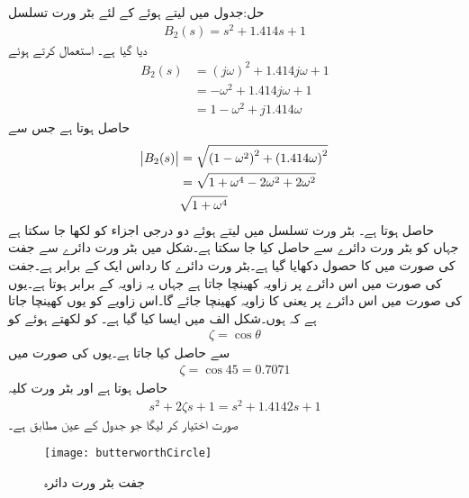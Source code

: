 حل:جدول میں  لیتے ہوئے  کے لئے بٹر ورت تسلسل
\begin{align*}
B_2(s)=s^2+1.414s+1
\end{align*}
دیا گیا ہے۔ استعمال کرتے ہوئے
\begin{align*}
B_2(s)&=\left(j \omega \right)^2 +1.414 j \omega +1\\
&=-\omega^2+1.414 j \omega +1\\
&=1-\omega^2+j 1.414 \omega
\end{align*}
حاصل ہوتا ہے جس سے
\begin{align*}
\abs{B_2(s)}&=\sqrt{\left(1-\omega^2 \right)^2+\left(1.414 \omega \right)^2}\\
&=\sqrt{1+\omega^4-2 \omega^2+2\omega^2}\\
&\sqrt{1+\omega^4}
\end{align*}
حاصل ہوتا ہے۔
بٹر ورت تسلسل میں  لیتے ہوئے دو درجی اجزاء کو  لکھا جا سکتا ہے جہاں  کو بٹر ورت دائرے  سے حاصل کیا جا سکتا ہے۔شکل  میں بٹر ورت دائرے سے جفت  کی صورت میں  کا حصول دکھایا گیا ہے۔بٹر ورت دائرے کا رداس ایک کے برابر ہے۔جفت  کی صورت میں اس دائرے پر زاویہ  کھینچا  جاتا ہے جہاں یہ زاویہ   کے برابر ہوتا ہے۔یوں  کی صورت میں اس دائرے پر  یعنی  کا زاویہ کھینچا جائے گا۔اس زاویے کو یوں کھینچا جاتا ہے کہ  ہوں۔شکل  الف میں ایسا کیا گیا ہے۔ کو  لکھتے ہوئے  کو
\begin{align}
\zeta=\cos \theta
\end{align}
سے حاصل کیا جاتا ہے۔یوں  کی صورت میں
\begin{align*}
\zeta=\cos 45=0.7071
\end{align*}
حاصل ہوتا ہے اور بٹر ورت کلیہ
\begin{align*}
s^2+2 \zeta s+1=s^2+1.4142s+1
\end{align*}
صورت اختیار کر لیگا جو جدول  کے عین مطابق ہے۔
\begin{figure}
\centering
\texttt{[image: butterworthCircle]}
\caption{جفت بٹر ورت دائرہ}
\label{شکل_تعددی_ردعمل_بٹر_ورت_دائرہ_جفت}
\end{figure}


